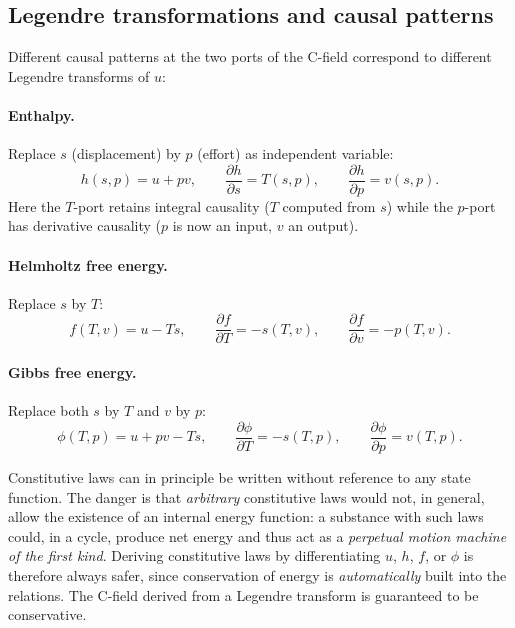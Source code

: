 \subsection{Legendre transformations and causal patterns}
\label{ssec:legendre}

Different causal patterns at the two ports of the C-field correspond to
different Legendre transforms of $u$:

\paragraph{Enthalpy.}  Replace $s$ (displacement) by $p$ (effort) as
independent variable:
\begin{equation}
  h(s, p) = u + pv,
  \qquad
  \frac{\partial h}{\partial s} = T(s,p),
  \qquad
  \frac{\partial h}{\partial p} = v(s,p).
  \label{eq:enthalpy}
\end{equation}
Here the $T$-port retains integral causality ($T$ computed from $s$) while
the $p$-port has derivative causality ($p$ is now an input, $v$ an output).

\paragraph{Helmholtz free energy.}  Replace $s$ by $T$:
\begin{equation}
  f(T,v) = u - Ts,
  \qquad
  \frac{\partial f}{\partial T} = -s(T,v),
  \qquad
  \frac{\partial f}{\partial v} = -p(T,v).
  \label{eq:helmholtz}
\end{equation}

\paragraph{Gibbs free energy.}  Replace both $s$ by $T$ and $v$ by $p$:
\begin{equation}
  \phi(T,p) = u + pv - Ts,
  \qquad
  \frac{\partial \phi}{\partial T} = -s(T,p),
  \qquad
  \frac{\partial \phi}{\partial p} = v(T,p).
  \label{eq:gibbs_free}
\end{equation}

\begin{insightbox}
  Constitutive laws can in principle be written without reference to any
  state function.  The danger is that \emph{arbitrary} constitutive laws
  would not, in general, allow the existence of an internal energy function:
  a substance with such laws could, in a cycle, produce net energy and thus
  act as a \emph{perpetual motion machine of the first kind}.  Deriving
  constitutive laws by differentiating $u$, $h$, $f$, or $\phi$ is therefore
  always safer, since conservation of energy is \emph{automatically} built
  into the relations.  The C-field derived from a Legendre transform is
  guaranteed to be conservative.
\end{insightbox}


